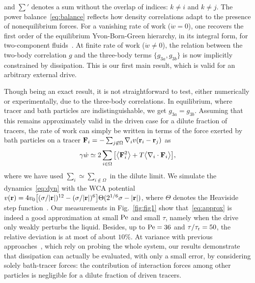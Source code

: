 \documentclass[pre, superscriptaddress, twocolumn,pre]{revtex4-1}
\begin{document}
and $\sum'$ denotes a sum without the overlap of indices: $k\neq i$ and $k\neq j$. The power balance~\eqref{eq:balance} reflects how density correlations adapt to the presence of nonequilibrium forces. For a vanishing rate of work ($\dot w = 0$), one recovers the first order of the equilibrium Yvon-Born-Green hierarchy, in its integral form, for two-component fluids~\cite{Hansen2013}. At finite rate of work ($\dot w\neq0$), the relation between the two-body correlation $g$ and the three-body terms $\{g_{3a},g_{3b}\}$ is now implicitly constrained by dissipation. This is our first main result, which is valid for an arbitrary external drive.


Though being an exact result, it is not straightforward to test, either numerically or experimentally, due to the three-body correlations. In equilibrium, where tracer and bath particles are indistinguishable, we get $g_{3a}=g_{3b}$. Assuming that this remains approximately valid in the driven case for a dilute fraction of tracers, the rate of work can simply be written in terms of the force exerted by bath particles on a tracer ${\bf F}_i =- \sum_{j\not\in\Omega}\nabla_iv({\bf r}_i-{\bf r}_j)$ as
\begin{equation}\label{eq:approx}
	\gamma\dot w \simeq 2\sum_{i\in\Omega} \big[ \big\langle{\bf F}_i^2\big\rangle + T \big\langle\nabla_i\cdot{\bf F}_i\big\rangle \big] ,
\end{equation}
where we have used $\sum_i\simeq\sum_{i\not\in\Omega}$ in the dilute limit. We simulate the dynamics~\eqref{eq:dyn} with the WCA potential $v({\bf r})=4v_0\big[(\sigma/|{\bf r}|)^{12}-(\sigma/|{\bf r}|)^6\big]\Theta(2^{1/6}\sigma-|{\bf r}|)$, where $\Theta$ denotes the Heaviside step function~\cite{WCA1971}. Our measurements in Fig.~\ref{fig:fig1} show that~\eqref{eq:approx} is indeed a good approximation at small $\rm Pe$ and small $\tau$, namely when the drive only weakly perturbs the liquid. Besides, up to ${\rm Pe}=36$ and $\tau/\tau_{\rm r}=50$, the relative deviation is at most of about $10\%$. At variance with previous approaches~\cite{Harada2005, Lander2012, Battle604}, which rely on probing the whole system, our results demonstrate that dissipation can actually be evaluated, with only a small error, by considering solely bath-tracer forces: the contribution of interaction forces among other particles is negligible for a dilute fraction of driven tracers.
\end{document}
